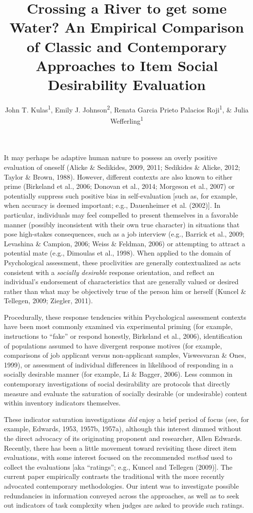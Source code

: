 \documentclass[
  ,man]{apa6}
\title{Crossing a River to get some Water? An Empirical Comparison of Classic and Contemporary Approaches to Item Social Desirability Evaluation}
\author{John T. Kulas\textsuperscript{1}, Emily J. Johnson\textsuperscript{2}, Renata Garcia Prieto Palacios Roji\textsuperscript{1}, \& Julia Wefferling\textsuperscript{1}}
\date{}
\affiliation{\vspace{0.5cm}\textsuperscript{1} Montclair State University\\\textsuperscript{2} St.~Cloud State University}
\begin{document}
\maketitle

It may perhaps be adaptive human nature to possess an overly positive evaluation of oneself (Alicke \& Sedikides, 2009, 2011; Sedikides \& Alicke, 2012; Taylor \& Brown, 1988). However, different contexts are also known to either prime (Birkeland et al., 2006; Donovan et al., 2014; Morgeson et al., 2007) or potentially suppress such positive bias in self-evaluation {[}such as, for example, when accuracy is deemed important; e.g., Dauenheimer et al. (2002){]}. In particular, individuals may feel compelled to present themselves in a favorable manner (possibly inconsistent with their own true character) in situations that pose high-stakes consequences, such as a job interview (e.g., Barrick et al., 2009; Levashina \& Campion, 2006; Weiss \& Feldman, 2006) or attempting to attract a potential mate (e.g., Dimoulas et al., 1998). When applied to the domain of Psychological assessment, these proclivities are generally contextualized as acts consistent with a \emph{socially desirable} response orientation, and reflect an individual's endorsement of characteristics that are generally valued or desired rather than what may be objectively true of the person him or herself (Kuncel \& Tellegen, 2009; Ziegler, 2011).

Procedurally, these response tendencies within Psychological assessment contexts have been most commonly examined via experimental priming (for example, instructions to ``fake'' or respond honestly, Birkeland et al., 2006), identification of populations assumed to have divergent response motives (for example, comparisons of job applicant versus non-applicant samples, Viswesvaran \& Ones, 1999), or assessment of individual differences in likelihood of responding in a socially desirable manner (for example, Li \& Bagger, 2006). Less common in contemporary investigations of social desirability are protocols that directly measure and evaluate the saturation of socially desirable (or undesirable) content within inventory indicators themselves.

These indicator saturation investigations \emph{did} enjoy a brief period of focus (see, for example, Edwards, 1953, 1957b, 1957a), although this interest dimmed without the direct advocacy of its originating proponent and researcher, Allen Edwards. Recently, there has been a little movement toward revisiting these direct item evaluations, with some interest focused on the recommended \emph{method} used to collect the evaluations {[}aka ``ratings''; e.g., Kuncel and Tellegen (2009){]}. The current paper empirically contrasts the traditional with the more recently advocated contemporary methodologies. Our intent was to investigate possible redundancies in information conveyed across the approaches, as well as to seek out indicators of task complexity when judges are asked to provide such ratings.
\end{document}
